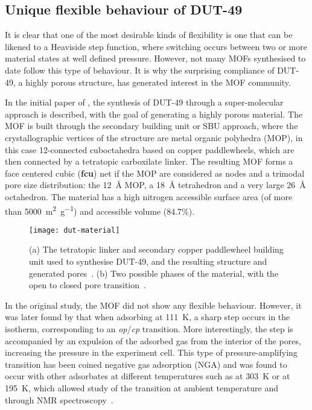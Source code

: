 \subsection{Unique flexible behaviour of DUT-49}

It is clear that one of the most desirable kinds of flexibility
is one that can be likened to a Heaviside step function, 
where switching occurs between two or more material states at 
well defined pressure. However, not many
MOFs synthesised to date follow this type of behaviour.
It is why the surprising compliance of DUT-49, a highly porous 
structure, has generated interest in the MOF community.

In the initial paper of \citet{stoeckHighlyPorousMetal2012}, the 
synthesis of DUT-49 through a super-molecular approach is 
described, with the goal of generating a highly porous material. 
The MOF is built through the secondary building unit or SBU 
approach, where the crystallographic vertices of the structure are 
metal organic polyhedra (MOP), in this case 12-connected cuboctahedra
based on copper paddlewheels, which are then connected by a tetratopic
carboxilate linker. The resulting MOF forms a face centered cubic 
(\textbf{fcu}) net if the MOP are considered as nodes and a trimodal 
pore size distribution: the \SI{12}{\angstrom} MOP, a \SI{18}{\angstrom}
tetrahedron and a very large \SI{26}{\angstrom} octahedron.
The material has a high nitrogen accessible surface area (of more
than \SI{5000}{\metre^2\per\gram}) and accessible volume (84.7\%).

\begin{figure}[htb]
    \centering
    \texttt{[image: dut-material]}%
    \caption{(a) The tetratopic linker and secondary copper 
    paddlewheel building unit used to synthesise DUT-49, 
    and the resulting structure and generated 
    pores~\cite{stoeckHighlyPorousMetal2012}. (b)
    Two possible phases of the material, with the 
    open to closed pore 
    transition~\cite{krausePressureamplifyingFrameworkMaterial2016}.}%
    \label{dut:fgr:dut-material}
\end{figure}

In the original study, the MOF did not show any flexible behaviour.
However, it was later found by 
\citet{krausePressureamplifyingFrameworkMaterial2016} that 
when adsorbing  at \SI{111}{\kelvin}, a sharp step occurs
in the isotherm, corresponding to an \textit{op}/\textit{cp} transition. 
More interestingly, the step is accompanied by an expulsion of the
adsorbed gas from the interior of the pores, increasing the pressure
in the experiment cell. This type of pressure-amplifying transition
has been coined negative gas adsorption (NGA) and was found to 
occur with other adsorbates at different temperatures such as  
at \SI{303}{\kelvin} or  at \SI{195}{\kelvin}, which allowed
study of the transition at ambient temperature and through 
 NMR spectroscopy~\cite{schaberSituMonitoringUnique2017}.

